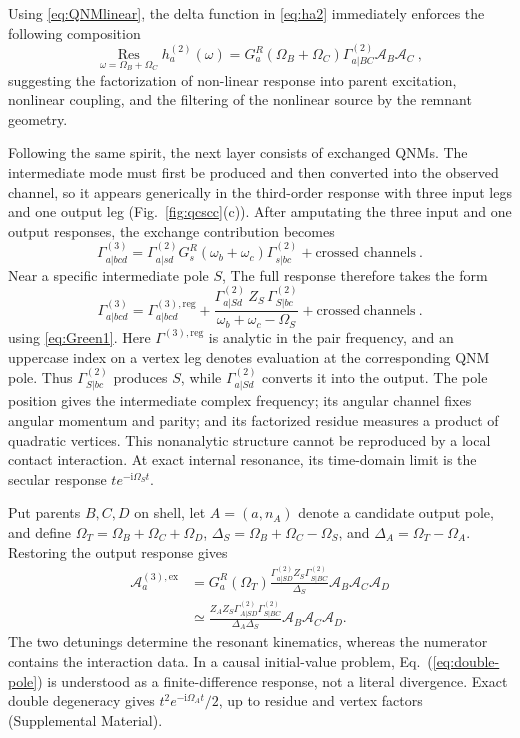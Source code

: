 \documentclass[
 reprint,
 amsmath,amssymb,
 aps,
 prl,
 superscriptaddress,
 nofootinbib
]{revtex4-2}
\newcommand{\Om}{\Omega}
\newcommand{\Res}{\operatorname*{Res}}
\newcommand{\ii}{\mathrm{i}}
\newcommand{\crossed}{\text{crossed}}
\begin{document}
Using \eqref{eq:QNMlinear}, the delta function in \eqref{eq:ha2} immediately enforces the following composition
\begin{equation}
\Res_{\omega=\Om_B+\Om_C}h_a^{(2)}(\omega)
=G_a^R(\Om_B+\Om_C) \Gamma^{(2)}_{a|BC} \mathcal{A}_B \mathcal{A}_C ~,
\label{eq:composite}
\end{equation}
suggesting the factorization of non-linear response into parent excitation, nonlinear coupling, and the filtering of the nonlinear source by the remnant geometry. 

Following the same spirit, the next layer consists of exchanged QNMs. The intermediate mode must first be produced and then converted into the observed channel, so it appears generically in the third-order response with three input legs and one output leg (Fig.~\ref{fig:qcscc}(c)). After amputating the three
input and one output responses, the exchange contribution becomes
\begin{equation}
	\Gamma^{(3)}_{a|bcd} =\Gamma^{(2)}_{a|sd} G_s^R(\omega_b+\omega_c) 
	\Gamma^{(2)}_{s|bc} + \text{crossed channels} ~.
\end{equation}
Near a specific intermediate pole $S$, The full response therefore takes the form
\begin{equation}
\Gamma^{(3)}_{a|bcd}
=\Gamma^{(3),\mathrm{reg}}_{a|bcd}
+\frac{\Gamma^{(2)}_{a|Sd}\,Z_S\,\Gamma^{(2)}_{S|bc}}
{\omega_b+\omega_c-\Om_S}
+\crossed\ \text{channels} ~.
\label{eq:exchange}
\end{equation}
using \eqref{eq:Green1}. Here \(\Gamma^{(3),\mathrm{reg}}\) is analytic in the pair frequency, and an
uppercase index on a vertex leg denotes evaluation at the corresponding QNM
pole. Thus \(\Gamma^{(2)}_{S|bc}\) produces \(S\), while
\(\Gamma^{(2)}_{a|Sd}\) converts it into the output. The pole position gives
the intermediate complex frequency; its angular channel fixes angular momentum
and parity; and its factorized residue measures a product of quadratic
vertices. This nonanalytic structure cannot be reproduced by a local contact
interaction. At exact internal resonance, its time-domain limit is the secular
response \(t e^{-\ii\Om_S t}\).

Put parents \(B,C,D\) on shell, let \(A=(a,n_A)\) denote a candidate output
pole, and define \(\Om_T=\Om_B+\Om_C+\Om_D\),
\(\Delta_S=\Om_B+\Om_C-\Om_S\), and \(\Delta_A=\Om_T-\Om_A\). Restoring the
output response gives
\begin{equation}
\begin{split}
\mathcal A_a^{(3),\mathrm{ex}}
&=G_a^R(\Om_T)
\frac{\Gamma^{(2)}_{a|SD}Z_S\Gamma^{(2)}_{S|BC}}{\Delta_S}
\mathcal A_B\mathcal A_C\mathcal A_D\\
&\simeq\frac{Z_AZ_S\Gamma^{(2)}_{A|SD}\Gamma^{(2)}_{S|BC}}
{\Delta_A\Delta_S}\mathcal A_B\mathcal A_C\mathcal A_D.
\end{split}
\label{eq:double-pole}
\end{equation}
The two detunings determine the resonant kinematics, whereas the numerator
contains the interaction data. In a causal initial-value problem,
Eq.~(\ref{eq:double-pole}) is understood as a finite-difference response, not a
literal divergence. Exact double degeneracy gives
\(t^2e^{-\ii\Om_A t}/2\), up to residue and vertex factors (Supplemental
Material).
\end{document}
